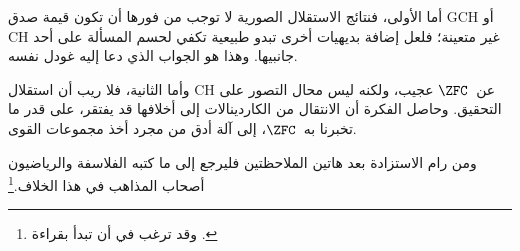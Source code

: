 \documentclass[../../../include/open-logic-section]{subfiles}
\begin{document}
أما الأولى، فنتائج الاستقلال الصورية لا توجب من فورها أن تكون قيمة صدق
GCH أو CH غير متعينة؛ فلعل إضافة بديهيات أخرى تبدو طبيعية تكفي لحسم
المسألة على أحد جانبيها. وهذا هو الجواب الذي دعا إليه غودل نفسه.

وأما الثانية، فلا ريب أن استقلال CH عن~$\ZFC$ عجيب، ولكنه ليس محال
التصور على التحقيق. وحاصل الفكرة أن الانتقال من الكاردينالات إلى
أخلافها قد يفتقر، على قدر ما تخبرنا به~$\ZFC$، إلى آلة أدق من مجرد أخذ
مجموعات القوى.

ومن رام الاستزادة بعد هاتين الملاحظتين فليرجع إلى ما كتبه الفلاسفة
والرياضيون أصحاب المذاهب في هذا الخلاف.\footnote{وقد ترغب في
أن تبدأ بقراءة \citet[\S15.6]{Potter2004}.}
\end{document}
